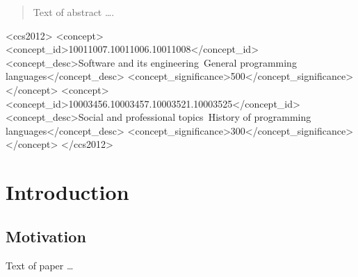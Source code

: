\documentclass[acmsmall,review,anonymous]{acmart}\settopmatter{printfolios=true,printccs=false,printacmref=false}
\begin{document}
\begin{abstract}
Text of abstract \ldots.
\end{abstract}


\begin{CCSXML}
<ccs2012>
<concept>
<concept_id>10011007.10011006.10011008</concept_id>
<concept_desc>Software and its engineering~General programming languages</concept_desc>
<concept_significance>500</concept_significance>
</concept>
<concept>
<concept_id>10003456.10003457.10003521.10003525</concept_id>
<concept_desc>Social and professional topics~History of programming languages</concept_desc>
<concept_significance>300</concept_significance>
</concept>
</ccs2012>
\end{CCSXML}





\maketitle


\section{Introduction}

\subsection{Motivation}
Text of paper \ldots
\end{document}
